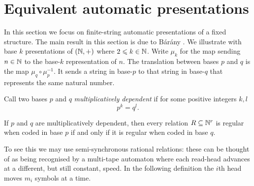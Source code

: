 


\section{Equivalent automatic presentations} \label{AS:sec:equiv}

In this section we focus on finite-string automatic presentations of a fixed structure. The main result in this section is due to B{\'a}r{\'a}ny \cite{Bara06}. We illustrate with base $k$ presentations of
$(\mathbb{N},+)$ where $2 \leqslant k \in \mathbb{N}$. Write $\mu_k$ for the map sending $n \in \mathbb{N}$ to the base-$k$ representation of $n$.
The translation between bases $p$ and $q$ is the map $\mu_q \circ \mu_p^{-1}$. It sends a string in base-$p$ to that
string in base-$q$ that represents the same natural number.

Call two bases $p$ and $q$ {\em multiplicatively dependent} if for some positive integers
$k,l$
\[
 p^k = q^l.
\]


\begin{proposition} \label{AS:prop:multdep}
If $p$ and $q$ are multiplicatively dependent, then every relation $R \subseteq \mathbb{N}^r$
is regular when coded in base $p$ if and only if it is regular when coded in base $q$.
\end{proposition}

To see this we may use semi-synchronous rational relations: these can be thought of as being
recognised by a multi-tape automaton where each read-head advances at a
different, but still constant, speed. In the following definition the $i$th head moves $m_i$ symbols at a time.

